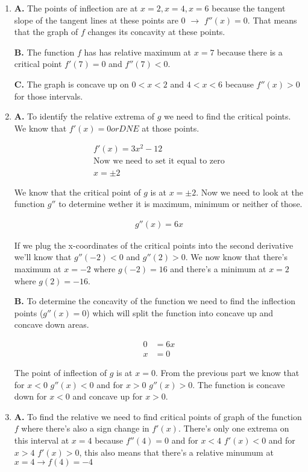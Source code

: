 \documentclass[13pt, a4paper, twoside]{article}
\begin{document}
\begin{enumerate}
\large \onehalfspacing
\item \textbf{A.} The points of inflection are at $x=2, x=4, x=6$ because the tangent
slope of the tangent lines at these points are 0 $\to$ $f''(x)=0$. That means
that the graph of $f$ changes its concavity at these points.


\textbf{B.} The function $f$ has has relative maximum at $x=7$ because there
is a critical point $f'(7)=0$ and $f''(7)<0$.


\textbf{C.} The graph is concave up on $0<x<2$ and $4<x<6$ because $f''(x)>0$
for those intervals.

\item \textbf{A.} To identify the relative extrema of $g$ we need to find the critical
points. We know that $f'(x)=0 or DNE$ at those points.

\begin{align*}
	f'(x) = 3x^2 - 12\\
	\text{Now we need to set it equal to zero} \\
	x = \pm 2 
\end{align*}

We know that the critical point of $g$ is at $x=\pm 2$. Now we need to look
at the function $g''$ to determine wether it is maximum, minimum or neither of those.

\begin{align*}
	g''(x) = 6x
\end{align*}

If we plug the x-coordinates of the critical points into the second derivative
we'll know that $g''(-2)<0$ and $g''(2)>0$. We now know that there's maximum
at $x=-2$ where $g(-2)=16$ and there's a minimum at $x=2$ where $g(2)=-16$. 


\textbf{B.} To determine the concavity of the function we need to find
the inflection points ($g''(x)=0$) which will split the function into concave
up and concave down areas.

\begin{align*}
	0 &= 6x \\
	x &=0
\end{align*}

The point of inflection of $g$ is at $x=0$. From the previous part we know
that for $x<0$ $g''(x)<0$ and for $x>0$ $g''(x)>0$. The function is 
concave down for $x<0$ and concave up for $x>0$.

\item \textbf{A.} To find the relative we need to find critical points
of graph of the function $f$ where there's also a sign change in $f'(x)$.
There's only one extrema on this interval at $x=4$ because $f''(4)=0$ and
for $x<4$ $f'(x)<0$ and for $x>4$ $f'(x)>0$, this also means that there's 
a relative minumum at $x=4 \to f(4)=-4$



\end{enumerate}
\end{document}
